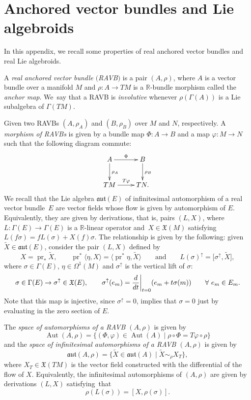 \documentclass[11pt]{article}
\numberwithin{equation}{section}
\numberwithin{equation}{section}
\newcommand{\R}{{\mathbb{R}}}
\newcommand{\X}{\mathfrak{X}}
\newcommand{\aut}{\mathfrak{aut}}
\DeclareMathOperator{\Aut}{Aut}
\DeclareMathOperator{\pr}{pr}
\begin{document}
\appendix

\section{Anchored vector bundles and Lie algebroids}\label{preliminaries0}
In this appendix, we recall some properties of real anchored vector bundles and real Lie algebroids.
\begin{Definition}
   A {\em real anchored vector bundle $($RAVB$)$} is a pair $(A, \rho)$, where $A$ is a vector bundle over a manifold $M$ and $\rho\colon A\to TM$ is a $\R$-bundle morphism called the {\em anchor map}. We~say that a RAVB is {\em involutive} whenever $\rho(\Gamma(A))$ is a Lie subalgebra of $\Gamma(TM)$.
\end{Definition}
Given two RAVBs $(A,\rho_A)$ and $(B,\rho_B)$ over $M$ and $N$, respectively. A {\em morphism of RAVBs} is given by a bundle map $\Phi\colon A\to B$ and a map $\varphi\colon M\to N$ such that the following diagram commute:
\[\xymatrix{A\ar[d]^{\rho_A}\ar[r]^{\Phi} & B\ar[d]^{\rho_B}\\ TM\ar[r]^{T\varphi} & TN.
}\]
We recall that the Lie algebra $\mathfrak{aut}(E)$ of infinitesimal automorphism of a real vector bundle~$E$ are vector fields \smash{$\widetilde{X}\in \X(E)$} whose flow is given by automorphism of $E$. Equivalently, they are given by derivations, that is, pairs $(L,X)$, where $L\colon \Gamma(E)\to \Gamma(E)$ is a $\R$-linear operator and~${X\in \X(M)}$ satisfying $L(f\sigma)=fL(\sigma)+X(f)\sigma$. The relationship is given by the following: given~${\widetilde{X}\in \aut(E)}$, consider the pair $(L,X)$ defined by
\[
X=\pr_* \widetilde{X},\qquad \pr^*\langle \eta, X \rangle=\bigl\langle \pr^*\eta,\widetilde{X} \bigr\rangle\qquad \text{and}\qquad
L(\sigma)^{\uparrow}=\bigl[\sigma^{\uparrow},\widetilde{X}\bigr],
\]
where $\sigma\in \Gamma(E)$, $\eta\in \Omega^{1}(M)$ and $\sigma^{\uparrow}$ is the vertical lift of $\sigma$:
\begin{align*}
   \sigma\in \Gamma(E)\to \sigma^{\uparrow}\in\X(E),\qquad
 \sigma^{\uparrow}(e_m)=\frac{{\rm d}}{{\rm d}t}\bigg\rvert_{t=0}(e_m+t\sigma(m))\qquad\forall\ e_m\in E_m.
 \end{align*}
 Note that this map is injective, since $\sigma^{\uparrow}=0$, implies that $\sigma=0$ just by evaluating in the zero section of $E$.

 The {\em space of automorphisms of a RAVB $(A,\rho)$} is given by
 \[\Aut(A,\rho)=\{(\Phi, \varphi)\in \Aut(A)\mid \rho\circ\Phi=T\varphi\circ \rho\}\]
 and the {\em space of infinitesimal automorphisms of a RAVB $(A,\rho)$} is given by
 \[\mathfrak{aut}(A,\rho)=\big\{ \widetilde{X}\in \aut(A)\mid \widetilde{X}\sim_{\rho} X_T \big\},\]
 where $X_T\in \X(TM)$ is the vector field constructed with the differential of the flow of $X$. Equivalently, the infinitesimal automorphisms of $(A,\rho)$ are given by derivations $(L,X)$ satisfying~that
 \[\rho(L(\sigma))=[X, \rho(\sigma)].\]
\end{document}
